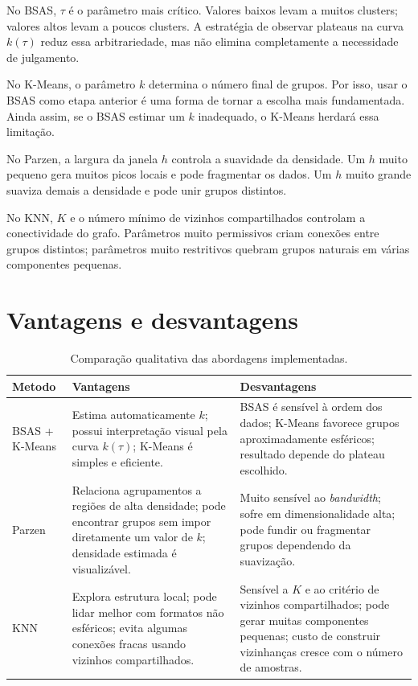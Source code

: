 \documentclass[12pt,a4paper]{article}
\begin{document}
No BSAS, $\tau$ é o parâmetro mais crítico. Valores baixos levam a muitos
clusters; valores altos levam a poucos clusters. A estratégia de observar
plateaus na curva $k(\tau)$ reduz essa arbitrariedade, mas não elimina
completamente a necessidade de julgamento.

No K-Means, o parâmetro $k$ determina o número final de grupos. Por isso, usar o
BSAS como etapa anterior é uma forma de tornar a escolha mais fundamentada.
Ainda assim, se o BSAS estimar um $k$ inadequado, o K-Means herdará essa
limitação.

No Parzen, a largura da janela $h$ controla a suavidade da densidade. Um $h$
muito pequeno gera muitos picos locais e pode fragmentar os dados. Um $h$ muito
grande suaviza demais a densidade e pode unir grupos distintos.

No KNN, $K$ e o número mínimo de vizinhos compartilhados controlam a
conectividade do grafo. Parâmetros muito permissivos criam conexões entre grupos
distintos; parâmetros muito restritivos quebram grupos naturais em várias
componentes pequenas.

\section{Vantagens e desvantagens}

\begin{table}[H]
\centering
\caption{Comparação qualitativa das abordagens implementadas.}
\label{tab:comparacao}
\begin{tabular}{p{3cm}p{5.4cm}p{5.4cm}}
\toprule
Metodo & Vantagens & Desvantagens \\
\midrule
BSAS + K-Means
& Estima automaticamente $k$; possui interpretação visual pela curva
$k(\tau)$; K-Means é simples e eficiente.
& BSAS é sensível à ordem dos dados; K-Means favorece grupos aproximadamente
esféricos; resultado depende do plateau escolhido. \\
\addlinespace
Parzen
& Relaciona agrupamentos a regiões de alta densidade; pode encontrar grupos
sem impor diretamente um valor de $k$; densidade estimada é visualizável.
& Muito sensível ao \textit{bandwidth}; sofre em dimensionalidade alta; pode
fundir ou fragmentar grupos dependendo da suavização. \\
\addlinespace
KNN
& Explora estrutura local; pode lidar melhor com formatos não esféricos; evita
algumas conexões fracas usando vizinhos compartilhados.
& Sensível a $K$ e ao critério de vizinhos compartilhados; pode gerar muitas
componentes pequenas; custo de construir vizinhanças cresce com o número de
amostras. \\
\bottomrule
\end{tabular}
\end{table}
\end{document}
